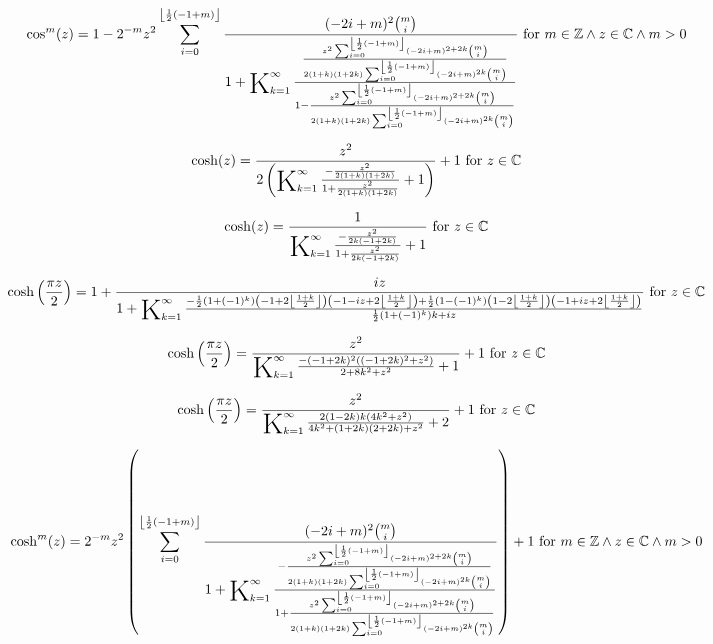 \documentclass{article}
\newcommand{\bigK}{\mathop{\raisebox{-5pt}{\huge K}}}
\begin{document}
\[\cos ^m(z)=1-2^{-m} z^2 \sum _{i=0}^{\left\lfloor \frac{1}{2} (-1+m)\right\rfloor } \frac{(-2 i+m)^2 \binom{m}{i}}{1+\bigK_{k=1}^{\infty}\frac{\frac{z^2 \sum _{i=0}^{\left\lfloor \frac{1}{2} (-1+m)\right\rfloor } (-2 i+m)^{2+2 k} \binom{m}{i}}{2 (1+k) (1+2 k) \sum _{i=0}^{\left\lfloor \frac{1}{2} (-1+m)\right\rfloor } (-2 i+m)^{2 k} \binom{m}{i}}}{1-\frac{z^2 \sum _{i=0}^{\left\lfloor \frac{1}{2} (-1+m)\right\rfloor } (-2 i+m)^{2+2 k} \binom{m}{i}}{2 (1+k) (1+2 k) \sum _{i=0}^{\left\lfloor \frac{1}{2} (-1+m)\right\rfloor } (-2 i+m)^{2 k} \binom{m}{i}}}}\text{ for }m\in \mathbb{Z}\land z\in \mathbb{C}\land m>0\] 

\[\cosh (z)=\frac{z^2}{2 \left(\bigK_{k=1}^{\infty}\frac{-\frac{z^2}{2 (1+k) (1+2 k)}}{1+\frac{z^2}{2 (1+k) (1+2 k)}}+1\right)}+1\text{ for }z\in \mathbb{C}\] 

\[\cosh (z)=\frac{1}{\bigK_{k=1}^{\infty}\frac{-\frac{z^2}{2 k (-1+2 k)}}{1+\frac{z^2}{2 k (-1+2 k)}}+1}\text{ for }z\in \mathbb{C}\] 

\[\cosh \left(\frac{\pi  z}{2}\right)=1+\frac{i z}{1+\bigK_{k=1}^{\infty}\frac{-\frac{1}{2} \left(1+(-1)^k\right) \left(-1+2 \left\lfloor \frac{1+k}{2}\right\rfloor \right) \left(-1-i z+2 \left\lfloor \frac{1+k}{2}\right\rfloor \right)+\frac{1}{2} \left(1-(-1)^k\right) \left(1-2 \left\lfloor \frac{1+k}{2}\right\rfloor \right) \left(-1+i z+2 \left\lfloor \frac{1+k}{2}\right\rfloor \right)}{\frac{1}{2} \left(1+(-1)^k\right) k+i z}}\text{ for }z\in \mathbb{C}\] 

\[\cosh \left(\frac{\pi  z}{2}\right)=\frac{z^2}{\bigK_{k=1}^{\infty}\frac{-(-1+2 k)^2 \left((-1+2 k)^2+z^2\right)}{2+8 k^2+z^2}+1}+1\text{ for }z\in \mathbb{C}\] 

\[\cosh \left(\frac{\pi  z}{2}\right)=\frac{z^2}{\bigK_{k=1}^{\infty}\frac{2 (1-2 k) k \left(4 k^2+z^2\right)}{4 k^2+(1+2 k) (2+2 k)+z^2}+2}+1\text{ for }z\in \mathbb{C}\] 

\[\cosh ^m(z)=2^{-m} z^2 \left(\sum _{i=0}^{\left\lfloor \frac{1}{2} (-1+m)\right\rfloor } \frac{(-2 i+m)^2 \binom{m}{i}}{1+\bigK_{k=1}^{\infty}\frac{-\frac{z^2 \sum _{i=0}^{\left\lfloor \frac{1}{2} (-1+m)\right\rfloor } (-2 i+m)^{2+2 k} \binom{m}{i}}{2 (1+k) (1+2 k) \sum _{i=0}^{\left\lfloor \frac{1}{2} (-1+m)\right\rfloor } (-2 i+m)^{2 k} \binom{m}{i}}}{1+\frac{z^2 \sum _{i=0}^{\left\lfloor \frac{1}{2} (-1+m)\right\rfloor } (-2 i+m)^{2+2 k} \binom{m}{i}}{2 (1+k) (1+2 k) \sum _{i=0}^{\left\lfloor \frac{1}{2} (-1+m)\right\rfloor } (-2 i+m)^{2 k} \binom{m}{i}}}}\right)+1\text{ for }m\in \mathbb{Z}\land z\in \mathbb{C}\land m>0\] 
\end{document}
